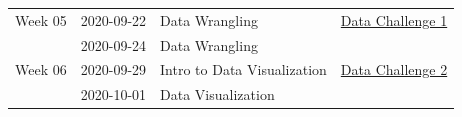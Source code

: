 \documentclass[
]{book}
\begin{document}
\begin{longtable}[]{@{}llll@{}}
\begin{minipage}[t]{0.22\columnwidth}\raggedright
Week 05\strut
\end{minipage} & \begin{minipage}[t]{0.22\columnwidth}\raggedright
2020-09-22\strut
\end{minipage} & \begin{minipage}[t]{0.22\columnwidth}\raggedright
Data Wrangling\strut
\end{minipage} & \begin{minipage}[t]{0.22\columnwidth}\raggedright
\href{https://classroom.github.com/a/0CjzlvtW}{Data Challenge 1}\strut
\end{minipage}\tabularnewline
\begin{minipage}[t]{0.22\columnwidth}\raggedright
\strut
\end{minipage} & \begin{minipage}[t]{0.22\columnwidth}\raggedright
2020-09-24\strut
\end{minipage} & \begin{minipage}[t]{0.22\columnwidth}\raggedright
Data Wrangling\strut
\end{minipage} & \begin{minipage}[t]{0.22\columnwidth}\raggedright
\strut
\end{minipage}\tabularnewline
\begin{minipage}[t]{0.22\columnwidth}\raggedright
Week 06\strut
\end{minipage} & \begin{minipage}[t]{0.22\columnwidth}\raggedright
2020-09-29\strut
\end{minipage} & \begin{minipage}[t]{0.22\columnwidth}\raggedright
Intro to Data Visualization\strut
\end{minipage} & \begin{minipage}[t]{0.22\columnwidth}\raggedright
\href{https://classroom.github.com/a/DhH5ciNQ}{Data Challenge 2}\strut
\end{minipage}\tabularnewline
\begin{minipage}[t]{0.22\columnwidth}\raggedright
\strut
\end{minipage} & \begin{minipage}[t]{0.22\columnwidth}\raggedright
2020-10-01\strut
\end{minipage} & \begin{minipage}[t]{0.22\columnwidth}\raggedright
Data Visualization\strut
\end{minipage} & \begin{minipage}[t]{0.22\columnwidth}\raggedright

\end{minipage}
\end{longtable}
\end{document}
